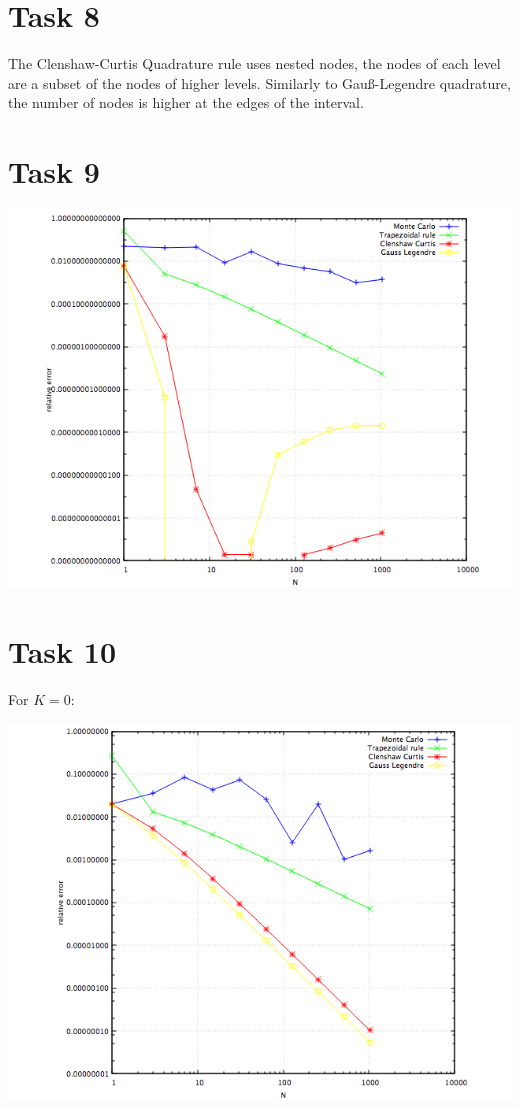\documentclass[10pt,a4paper]{article}
\begin{document}
\section*{Task 8}

The Clenshaw-Curtis Quadrature rule uses nested nodes, the nodes of each level are a subset of the nodes of higher levels. Similarly to Gauß-Legendre quadrature, the number of nodes is higher at the edges of the interval. 

\section*{Task 9}

\begin{center}
\includegraphics[scale=0.5]{task_9.png}		
\end{center}	

\section*{Task 10}

For $K=0$:
\begin{center}
\includegraphics[scale=0.5]{relative_errors_K0.png}		
\end{center}	
\end{document}
